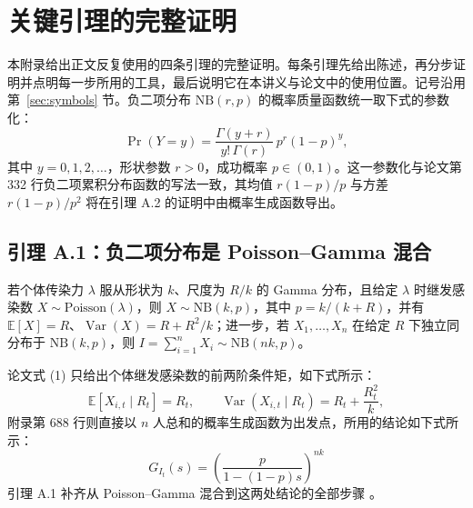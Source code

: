 \section{关键引理的完整证明}\label{app:lemmas}

本附录给出正文反复使用的四条引理的完整证明。每条引理先给出陈述，再分步证明并点明每一步所用的工具，最后说明它在本讲义与论文中的使用位置。记号沿用第~\ref{sec:symbols} 节。负二项分布 $\mathrm{NB}(r,p)$ 的概率质量函数统一取下式的参数化：
\begin{equation}\label{eq:ap-nbpmf}
\Pr(Y=y)=\frac{\Gamma(y+r)}{y!\,\Gamma(r)}\,p^{r}(1-p)^{y},
\end{equation}
其中 $y=0,1,2,\dots$，形状参数 $r>0$，成功概率 $p\in(0,1)$。这一参数化与论文第 332 行负二项累积分布函数的写法一致，其均值 $r(1-p)/p$ 与方差 $r(1-p)/p^2$ 将在引理 A.2 的证明中由概率生成函数导出。

\subsection{引理 A.1：负二项分布是 Poisson–Gamma 混合}\label{lem:ap-nb}

若个体传染力 $\lambda$ 服从形状为 $k$、尺度为 $R/k$ 的 Gamma 分布，且给定 $\lambda$ 时继发感染数 $X\sim\mathrm{Poisson}(\lambda)$，则 $X\sim\mathrm{NB}(k,p)$，其中 $p=k/(k+R)$，并有 $\mathbb{E}[X]=R$、$\operatorname{Var}(X)=R+R^2/k$；进一步，若 $X_1,\dots,X_n$ 在给定 $R$ 下独立同分布于 $\mathrm{NB}(k,p)$，则 $I=\sum_{i=1}^nX_i\sim\mathrm{NB}(nk,p)$。

论文式 (1) 只给出个体继发感染数的前两阶条件矩，如下式所示：
\begin{equation*}
\mathbb{E}[X_{i,t} \mid R_t] = R_t, \qquad
\operatorname{Var}(X_{i,t} \mid R_t) = R_t + \frac{R_t^2}{k},
\tag{原文式 1}
\end{equation*}
附录第 688 行则直接以 $n$ 人总和的概率生成函数为出发点，所用的结论如下式所示：
\begin{equation*}
G_{I_t}(s) = \left(\frac{p}{1 - (1-p)s}\right)^{nk}
\tag*{原文第 688 行}
\end{equation*}
引理 A.1 补齐从 Poisson--Gamma 混合到这两处结论的全部步骤 \citep{casella2002statistical}。

